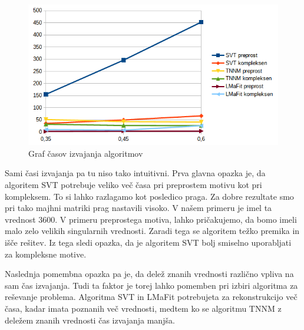 \begin{figure}[!ht]
    \centering
    \includegraphics[width=\linewidth]{Poglavja/Slike/kompleksna grayscale 300/cas.png}
    \caption{Graf časov izvajanja algoritmov}
\end{figure}
Sami časi izvajanja pa tu niso tako intuitivni. Prva glavna opazka je, da algoritem SVT potrebuje veliko več časa pri preprostem motivu kot pri kompleksem.  To si lahko razlagamo kot posledico praga. Za dobre rezultate smo pri tako majhni matriki prag nastavili visoko. V našem primeru je imel ta vrednost $3600$. V primeru preprostega motiva, lahko pričakujemo, da bomo imeli malo zelo velikih singularnih vrednosti. Zaradi tega se algoritem težko premika in išče rešitev. Iz tega sledi opazka, da je algoritem SVT bolj smiselno uporabljati za kompleksne motive.

Naslednja pomembna opazka pa je, da delež znanih vrednosti različno vpliva na sam čas izvajanja. Tudi ta faktor je torej lahko pomemben pri izbiri algoritma za reševanje problema. Algoritma SVT in LMaFit potrebujeta za rekonstrukcijo več časa, kadar imata poznanih več vrednosti, medtem ko se algoritmu TNNM z deležem znanih vrednosti čas izvajanja manjša.